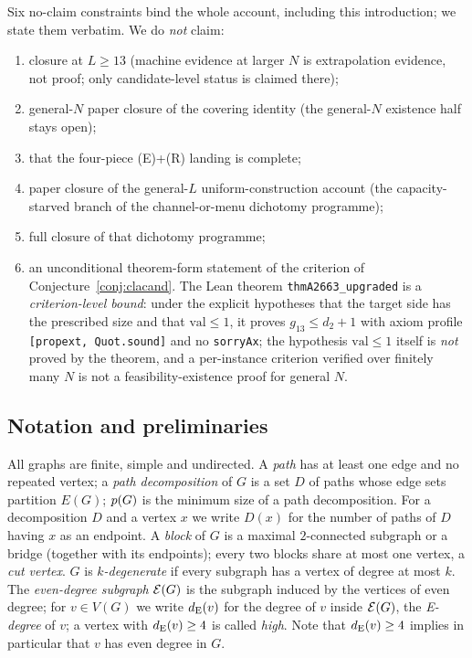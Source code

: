 Six no-claim constraints bind the whole account, including this introduction; we state them
verbatim. We do \emph{not} claim:
\begin{enumerate}[label=\textup{(\arabic*)},leftmargin=2em]
\item closure at $L\ge13$ (machine evidence at larger $N$ is extrapolation evidence, not
proof; only candidate-level status is claimed there);
\item general-$N$ paper closure of the covering identity (the general-$N$ existence half
stays open);
\item that the four-piece (E)+(R) landing is complete;
\item paper closure of the general-$L$ uniform-construction account (the
capacity-starved branch of the channel-or-menu dichotomy programme);
\item full closure of that dichotomy programme;
\item an unconditional theorem-form statement of the criterion of
Conjecture~\ref{conj:clacand}. The Lean theorem \texttt{thmA2663\_upgraded} is a
\emph{criterion-level bound}: under the explicit hypotheses that the target side has the
prescribed size and that $\mathrm{val}\le1$, it proves $g_{13}\le d_2+1$ with axiom profile
\texttt{[propext, Quot.sound]} and no \texttt{sorryAx}; the hypothesis $\mathrm{val}\le1$
itself is \emph{not} proved by the theorem, and a per-instance criterion verified over
finitely many $N$ is not a feasibility-existence proof for general $N$.
\end{enumerate}

\subsection{Notation and preliminaries}\label{int:subsec-notation}

All graphs are finite, simple and undirected. A \emph{path} has at least one edge and no
repeated vertex; a \emph{path decomposition} of $G$ is a set $D$ of paths whose edge sets
partition $E(G)$; $p(G)$ is the minimum size of a path decomposition. For a decomposition
$D$ and a vertex $x$ we write $D(x)$ for the number of paths of $D$ having $x$ as an
endpoint. A \emph{block} of $G$ is a maximal $2$-connected subgraph or a bridge (together
with its endpoints); every two blocks share at most one vertex, a \emph{cut vertex}. $G$ is
\emph{$k$-degenerate} if every subgraph has a vertex of degree at most $k$. The
\emph{even-degree subgraph} $\mathcal{E}(G)$ is the subgraph induced by the vertices of even degree;
for $v\in V(G)$ we write $d_{\mathrm{E}}(v)$ for the degree of $v$ inside $\mathcal{E}(G)$, the \emph{E-degree}
of $v$; a vertex with $d_{\mathrm{E}}(v)\ge4$ is called \emph{high}. Note that $d_{\mathrm{E}}(v)\ge4$ implies
in particular that $v$ has even degree in $G$.

